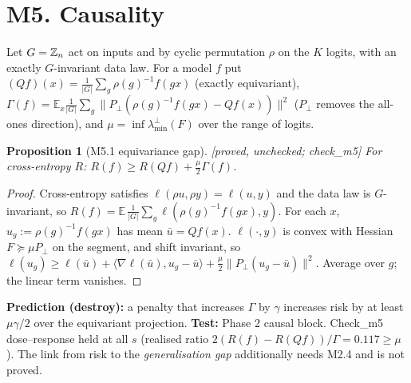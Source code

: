 \documentclass[11pt]{article}
\newtheorem{prop}{Proposition}
\theoremstyle{remark}\newtheorem{rem}{Remark}
\newcommand{\status}[1]{\hfill\textsf{[#1]}}
\begin{document}
\section*{M5. Causality}
Let $G=\mathbb Z_n$ act on inputs and by cyclic permutation $\rho$ on the $K$ logits, with an exactly $G$-invariant data law. For a model $f$ put $(Qf)(x)=\frac1{|G|}\sum_g\rho(g)^{-1}f(gx)$ (exactly equivariant), $\Gamma(f)=\mathbb E_x\frac1{|G|}\sum_g\|P_\perp(\rho(g)^{-1}f(gx)-Qf(x))\|^2$ ($P_\perp$ removes the all-ones direction), and $\mu=\inf\lambda_{\min}^{\perp}(F)$ over the range of logits.
\begin{prop}[M5.1 equivariance gap]\status{proved, unchecked; check\_m5}
For cross-entropy $R$: $R(f)\ge R(Qf)+\tfrac\mu2\Gamma(f)$.
\end{prop}
\begin{proof}
Cross-entropy satisfies $\ell(\rho u,\rho y)=\ell(u,y)$ and the data law is $G$-invariant, so $R(f)=\mathbb E\,\frac1{|G|}\sum_g\ell(\rho(g)^{-1}f(gx),y)$. For each $x$, $u_g:=\rho(g)^{-1}f(gx)$ has mean $\bar u=Qf(x)$. $\ell(\cdot,y)$ is convex with Hessian $F\succeq\mu P_\perp$ on the segment, and shift invariant, so $\ell(u_g)\ge\ell(\bar u)+\langle\nabla\ell(\bar u),u_g-\bar u\rangle+\tfrac\mu2\|P_\perp(u_g-\bar u)\|^2$. Average over $g$; the linear term vanishes. \qedhere
\end{proof}
\textbf{Prediction (destroy):} a penalty that increases $\Gamma$ by $\gamma$ increases risk by at least $\mu\gamma/2$ over the equivariant projection. \textbf{Test:} Phase 2 causal block. Check\_m5 dose--response held at all $s$ (realised ratio $2(R(f)-R(Qf))/\Gamma=0.117\ge\mu$). The link from risk to the \emph{generalisation gap} additionally needs M2.4 and is not proved.
\end{document}
